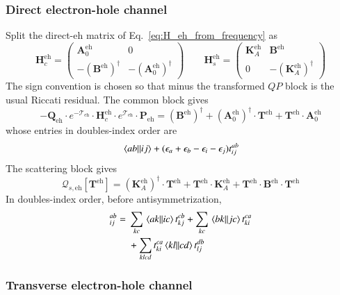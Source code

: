 \documentclass[aip,jcp,reprint,noshowkeys,superscriptaddress]{revtex4-1}
\newcommand{\eh}{\text{eh}}
\newcommand{\bT}{\boldsymbol{T}}
\newcommand{\bA}{\boldsymbol{A}}
\newcommand{\bB}{\boldsymbol{B}}
\newcommand{\bH}{\boldsymbol{H}}
\newcommand{\bK}{\boldsymbol{K}}
\newcommand{\bP}{\boldsymbol{P}}
\newcommand{\bQ}{\boldsymbol{Q}}
\newcommand{\bchi}{\boldsymbol{\chi}}
\newcommand{\bcalT}{\boldsymbol{\mathcal{T}}}
\newcommand{\bcalQ}{\boldsymbol{\mathcal{Q}}}
\begin{document}
\subsubsection{Direct electron-hole channel}

Split the direct-$\eh$ matrix of Eq.~\eqref{eq:H_eh_from_frequency} as
\begin{equation}
    \bH_c^{\eh}
    =
    \begin{pmatrix}
        \bA_0^{\eh}&0\\
        -(\bB^{\eh})^{\dagger}&-(\bA_0^{\eh})^{\dagger}
    \end{pmatrix}
    \qquad
    \bH_s^{\eh}
    =
    \begin{pmatrix}
        \bK_A^{\eh}&\bB^{\eh}\\
        0&-(\bK_A^{\eh})^{\dagger}
    \end{pmatrix}
    \label{eq:split_eh}
\end{equation}
The sign convention is chosen so that minus the transformed $QP$ block is the
usual Riccati residual.  The common block gives
\begin{equation}
    -\bQ_{\eh}\cdot e^{-\bcalT_{\eh}}
    \cdot \bH_c^{\eh}
    \cdot e^{\bcalT_{\eh}}\cdot \bP_{\eh}
    =(\bB^{\eh})^{\dagger}
    +(\bA_0^{\eh})^{\dagger}\cdot\bT^{\eh}
    +\bT^{\eh}\cdot \bA_0^{\eh}
    \label{eq:common_eh}
\end{equation}
whose entries in doubles-index order are
\begin{equation}
    \mel{ab}{}{ij}
    +
    (\epsilon_a+\epsilon_b-\epsilon_i-\epsilon_j)t_{ij}^{ab}
    \label{eq:common_tensor}
\end{equation}
The scattering block gives
\begin{equation}
    \bcalQ_{s,\eh}[\bT^{\eh}]
    =(\bK_A^{\eh})^{\dagger}\cdot\bT^{\eh}
    +\bT^{\eh}\cdot \bK_A^{\eh}
    +\bT^{\eh}\cdot \bB^{\eh}\cdot\bT^{\eh}
    \label{eq:Xi_eh_matrix}
\end{equation}
In doubles-index order, before antisymmetrization,
\begin{align}
    [\bchi^{\eh}]_{ij}^{ab}
    ={}&
    \sum_{kc}\mel{ak}{}{ic}t_{kj}^{cb}
    +
    \sum_{kc}\mel{bk}{}{jc}t_{ki}^{ca}
    \nonumber\\
    &+
    \sum_{klcd}
    t_{ki}^{ca}\mel{kl}{}{cd}t_{lj}^{db}
    \label{eq:Xi_eh_explicit}
\end{align}

\subsubsection{Transverse electron-hole channel}
\end{document}
